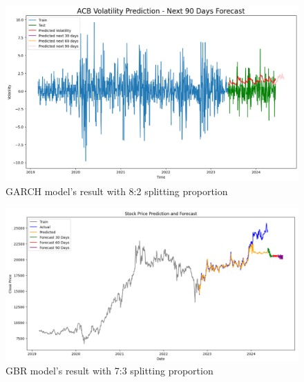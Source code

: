 \documentclass{ieeeojies}
\begin{document}
\begin{figure}[H]
  \centering
  \begin{minipage}{0.8\linewidth}
    \centering
    \includegraphics[width=\linewidth]{bibliography/ACB-GARCH-8-2.png}
    \caption{GARCH model's result with 8:2 splitting proportion}
    \label{fig8}
  \end{minipage}
\end{figure}
\begin{figure}[H]
  \centering
  \begin{minipage}{0.8\linewidth}
    \centering
    \includegraphics[width=\linewidth]{bibliography/ACB-GBR-7-3.png}
    \caption{GBR model's result with 7:3 splitting proportion}
    \label{fig18}
  \end{minipage}
\end{figure}
\end{document}
